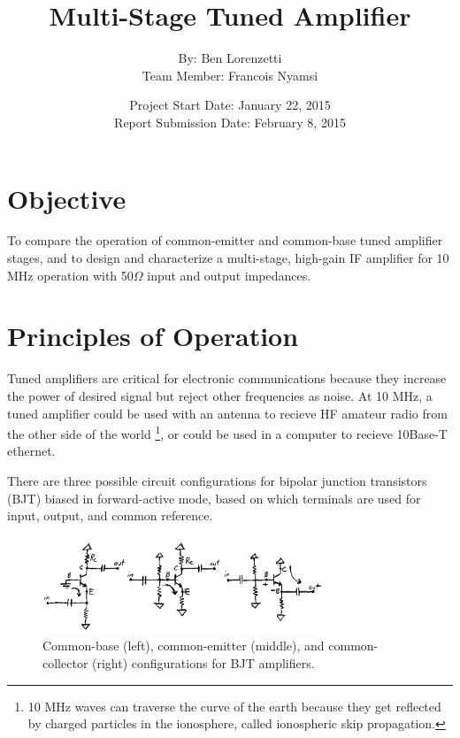 \documentclass[titlepage, letterpaper, 11pt]{article}
\begin{document}
\title{Multi-Stage Tuned Amplifier}
\author{By: Ben Lorenzetti\\
Team Member: Francois Nyamsi}
\date{Project Start Date: January 22, 2015\\
Report Submission Date: February 8, 2015}
\maketitle

\clearpage
\mbox{}
\thispagestyle{empty}
\clearpage
\setcounter{page}{1}

\tableofcontents

\section{Objective}

To compare the operation of common-emitter and common-base tuned
amplifier stages, and to design and characterize a multi-stage,
high-gain IF amplifier for 10 MHz operation with 50$\Omega$ input and
output impedances.

\clearpage
\section{Principles of Operation}

Tuned amplifiers are critical for electronic communications because
they increase the power of desired signal but reject other frequencies
as noise. At 10 MHz, a tuned amplifier could be used with an antenna
to recieve HF amateur radio from the other side of the world
\footnote{10 MHz waves can traverse the curve of the earth because
they get reflected by charged particles in the ionosphere, called
ionospheric skip propagation.},
or could be used in a computer to recieve 10Base-T ethernet.

There are three possible circuit configurations for bipolar junction
transistors (BJT) biased in forward-active mode, based on
which terminals are used for input, output, and common reference.

\begin{figure}[ht]
	\centering
	\includegraphics[width=0.75\textwidth]
		{figures/BJTforwardBiasConfigurations.png}
	\caption{
		Common-base (left), common-emitter (middle), and
		common-collector (right) configurations for BJT
		amplifiers.
	}
	\label{BJTforwardBiasConfigurations}
\end{figure}
\end{document}
